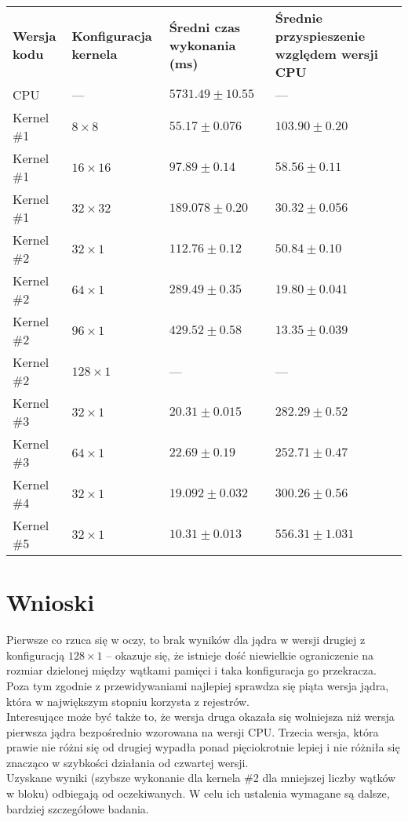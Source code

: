 \documentclass[12pt, a4paper]{article}
\begin{document}
\begin{center}
\begin{tabular}{|p{2.9cm}|p{2.7cm}|p{5cm}|p{3.5cm}|p{5cm}|}
    \hline
    \rowcolor{gray}
\textbf{Wersja kodu} & 
\textbf{Konfiguracja \newline kernela} & 
\textbf{Średni \newline czas wykonania \newline (ms)} & 
\textbf{Średnie \newline przyspieszenie \newline względem \newline wersji CPU}\\
CPU & --- & $5731.49 \pm 10.55$ & --- \\
    \hline
Kernel \#1 & $8 \times 8$ & $55.17 \pm 0.076$ & $103.90 \pm 0.20$ \\
    \hline
Kernel \#1 & $16 \times 16$ & $97.89\pm 0.14$ & $58.56\pm 0.11$ \\
    \hline
Kernel \#1 & $32 \times 32$ & $189.078 \pm 0.20$ & $30.32\pm 0.056$ \\
    \hline
Kernel \#2 & $32 \times 1$ & $112.76 \pm 0.12$ & $50.84\pm 0.10$ \\
    \hline
Kernel \#2 & $64 \times 1$ & $289.49 \pm 0.35$ & $19.80\pm 0.041$ \\
    \hline
Kernel \#2 & $96 \times 1$ & $429.52 \pm 0.58$ & $13.35\pm 0.039$ \\
    \hline
Kernel \#2 & $128 \times 1$ & --- & --- \\
    \hline
Kernel \#3 & $32 \times 1$ & $20.31\pm 0.015$ & $282.29\pm 0.52$ \\
    \hline
Kernel \#3 & $64 \times 1$ & $22.69\pm 0.19$ & $252.71 \pm 0.47$ \\
    \hline
Kernel \#4 & $32 \times 1$ & $19.092\pm 0.032$ & $300.26\pm 0.56$ \\
    \hline
Kernel \#5 & $32 \times 1$ & $10.31\pm 0.013$ & $556.31\pm 1.031$ \\
    \hline
\end{tabular}
\end{center}

\section*{Wnioski}
Pierwsze co rzuca się w oczy, to brak wyników dla jądra w wersji drugiej
z konfiguracją $128 \times 1$ -- okazuje się, że istnieje dość niewielkie
ograniczenie na rozmiar dzielonej między wątkami pamięci i taka konfiguracja go
przekracza.\\
Poza tym zgodnie z przewidywaniami najlepiej sprawdza się piąta wersja jądra,
która w największym stopniu korzysta z rejestrów.\\
Interesujące może być także to, że wersja druga okazała się wolniejsza niż
wersja pierwsza jądra bezpośrednio wzorowana na wersji CPU. Trzecia wersja,
która prawie nie różni się od drugiej wypadła ponad pięciokrotnie lepiej i nie
różniła się znacząco w szybkości działania od czwartej wersji.\\
Uzyskane wyniki (szybsze wykonanie dla kernela \#2 dla mniejszej liczby wątków
w bloku) odbiegają od oczekiwanych. W celu ich ustalenia wymagane są dalsze,
bardziej szczegółowe badania.
\end{document}

